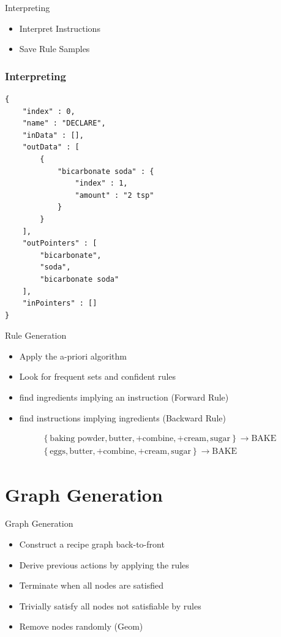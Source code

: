 \documentclass{beamer}
\begin{document}
\begin{frame}{Interpreting}
 \begin{itemize}
  \item Interpret Instructions
  \item Save Rule Samples
 \end{itemize}
\end{frame}

\begin{frame}[fragile=singleslide]\frametitle{Interpreting}
 \begin{verbatim}
{
    "index" : 0,
    "name" : "DECLARE",
    "inData" : [],
    "outData" : [ 
        {
            "bicarbonate soda" : {
                "index" : 1,
                "amount" : "2 tsp"
            }
        }
    ],
    "outPointers" : [ 
        "bicarbonate", 
        "soda", 
        "bicarbonate soda"
    ],
    "inPointers" : []
}
 \end{verbatim}
 
\end{frame}

\begin{frame}{Rule Generation}

\begin{itemize}
 \item Apply the a-priori algorithm
 \item Look for frequent sets and confident rules
 \item find ingredients implying an instruction (Forward Rule)
 \item find instructions implying ingredients (Backward Rule)
\end{itemize}



\begin{align}
 \left\{ \text{baking powder}, \text{butter}, \text{+combine}, \text{+cream}, \text{sugar} \right\}
      \rightarrow \text{BAKE} \nonumber \\
  \left\{ \text{eggs}, \text{butter}, \text{+combine}, \text{+cream}, \text{sugar} \right\}
      \rightarrow \text{BAKE} \nonumber 
\end{align}


\end{frame}


\section{Graph Generation}
\begin{frame}{Graph Generation}
\begin{itemize}
 \item Construct a recipe graph back-to-front
 \item Derive previous actions by applying the rules
 \item Terminate when all nodes are satisfied
 \item Trivially satisfy all nodes not satisfiable by rules
 \item Remove nodes randomly (Geom)
\end{itemize}
\end{frame}
\end{document}
